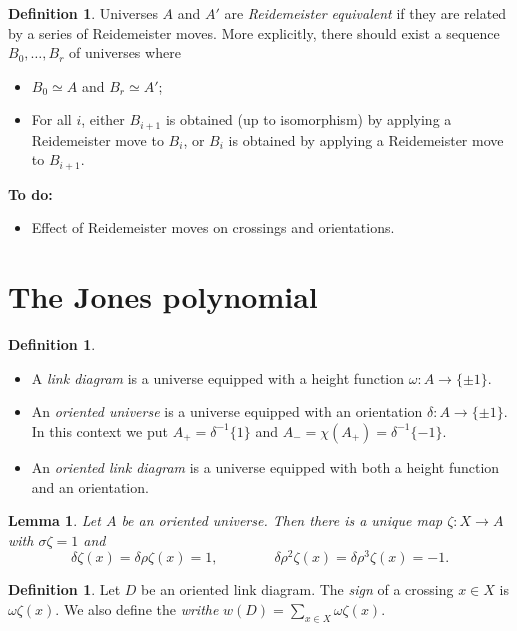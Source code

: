 \documentclass{amsart}
\newcommand{\dl}        {\delta}
\newcommand{\om}        {\omega}
\newcommand{\sg}        {\sigma}
\newcommand{\zt}        {\zeta}
\renewcommand{\:}{\colon}
\newtheorem{lemma}[theorem]{Lemma}
\theoremstyle{definition}
\newtheorem{definition}[theorem]{Definition}
\begin{document}
\begin{definition}
 Universes $A$ and $A'$ are \emph{Reidemeister equivalent} if they are
 related by a series of Reidemeister moves.  More explicitly, there
 should exist a sequence $B_0,\dotsc,B_r$ of universes where
 \begin{itemize}
  \item $B_0\simeq A$ and $B_r\simeq A'$;
  \item For all $i$, either $B_{i+1}$ is obtained (up to isomorphism)
   by applying a Reidemeister move to $B_i$, or $B_i$ is obtained by
   applying a Reidemeister move to $B_{i+1}$.
 \end{itemize}
\end{definition}

\textbf{To do:}
\begin{itemize}
 \item Effect of Reidemeister moves on crossings and orientations.
\end{itemize}

\section{The Jones polynomial}

\begin{definition}
 \begin{itemize}
  \item A \emph{link diagram} is a universe equipped with a height
   function $\om\:A\to\{\pm 1\}$.  
  \item An \emph{oriented universe} is a universe equipped with an
   orientation $\dl\:A\to\{\pm 1\}$.  In this context we put
   $A_+=\dl^{-1}\{1\}$ and $A_-=\chi(A_+)=\dl^{-1}\{-1\}$.
  \item An \emph{oriented link diagram} is a universe equipped with
   both a height function and an orientation.
 \end{itemize}
\end{definition}

\begin{lemma}
 Let $A$ be an oriented universe.  Then there is a
 unique map $\zt\:X\to A$ with $\sg\zt=1$ and 
 \[ \dl\zt(x) = \dl\rho\zt(x)=1,\hspace{4em}
    \dl\rho^2\zt(x) = \dl\rho^3\zt(x)=-1.
 \]
\end{lemma}

\begin{definition}
 Let $D$ be an oriented link diagram.  The \emph{sign} of a crossing
 $x\in X$ is $\om\zt(x)$.  We also define the \emph{writhe}
 $w(D)=\sum_{x\in X}\om\zt(x)$.
\end{definition}
\end{document}
